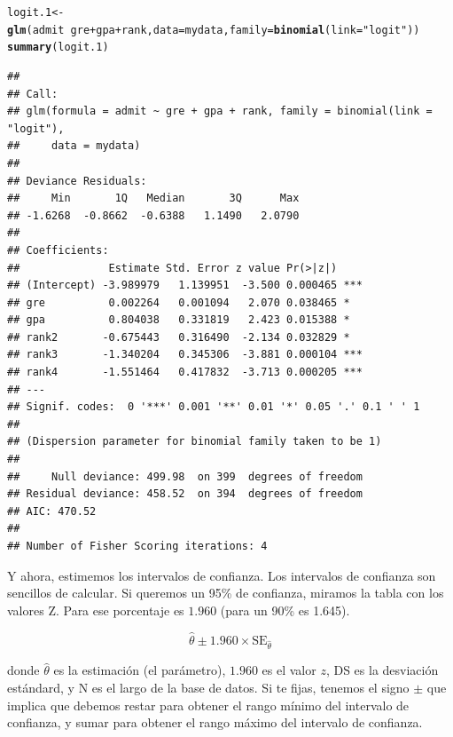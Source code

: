 \documentclass[onesided]{article}\usepackage[]{graphicx}\usepackage[]{color}
\makeatletter
\newcommand{\hlstr}[1]{\textcolor[rgb]{0.192,0.494,0.8}{#1}}%
\newcommand{\hlopt}[1]{\textcolor[rgb]{0,0,0}{#1}}%
\newcommand{\hlstd}[1]{\textcolor[rgb]{0.345,0.345,0.345}{#1}}%
\newcommand{\hlkwb}[1]{\textcolor[rgb]{0.69,0.353,0.396}{#1}}%
\newcommand{\hlkwc}[1]{\textcolor[rgb]{0.333,0.667,0.333}{#1}}%
\newcommand{\hlkwd}[1]{\textcolor[rgb]{0.737,0.353,0.396}{\textbf{#1}}}%
\newenvironment{kframe}{%
 \def\at@end@of@kframe{}%
 \ifinner\ifhmode%
  \def\at@end@of@kframe{\end{minipage}}%
  \begin{minipage}{\columnwidth}%
 \fi\fi%
 \def\FrameCommand##1{\hskip\@totalleftmargin \hskip-\fboxsep
 \colorbox{shadecolor}{##1}\hskip-\fboxsep
     \hskip-\linewidth \hskip-\@totalleftmargin \hskip\columnwidth}%
 \MakeFramed {\advance\hsize-\width
   \@totalleftmargin\z@ \linewidth\hsize
   \@setminipage}}%
 {\par\unskip\endMakeFramed%
 \at@end@of@kframe}
\newenvironment{knitrout}{}{} %
\makeatother
\begin{document}
\begin{knitrout}
\color{fgcolor}\begin{kframe}
\begin{alltt}
\hlstd{logit.1} \hlkwb{<-} \hlkwd{glm}\hlstd{(admit} \hlopt{~} \hlstd{gre} \hlopt{+} \hlstd{gpa} \hlopt{+} \hlstd{rank,} \hlkwc{data} \hlstd{= mydata,} \hlkwc{family} \hlstd{=} \hlkwd{binomial}\hlstd{(}\hlkwc{link} \hlstd{=} \hlstr{"logit"}\hlstd{))}
\hlkwd{summary}\hlstd{(logit.1)}
\end{alltt}
\begin{verbatim}
## 
## Call:
## glm(formula = admit ~ gre + gpa + rank, family = binomial(link = "logit"), 
##     data = mydata)
## 
## Deviance Residuals: 
##     Min       1Q   Median       3Q      Max  
## -1.6268  -0.8662  -0.6388   1.1490   2.0790  
## 
## Coefficients:
##              Estimate Std. Error z value Pr(>|z|)    
## (Intercept) -3.989979   1.139951  -3.500 0.000465 ***
## gre          0.002264   0.001094   2.070 0.038465 *  
## gpa          0.804038   0.331819   2.423 0.015388 *  
## rank2       -0.675443   0.316490  -2.134 0.032829 *  
## rank3       -1.340204   0.345306  -3.881 0.000104 ***
## rank4       -1.551464   0.417832  -3.713 0.000205 ***
## ---
## Signif. codes:  0 '***' 0.001 '**' 0.01 '*' 0.05 '.' 0.1 ' ' 1
## 
## (Dispersion parameter for binomial family taken to be 1)
## 
##     Null deviance: 499.98  on 399  degrees of freedom
## Residual deviance: 458.52  on 394  degrees of freedom
## AIC: 470.52
## 
## Number of Fisher Scoring iterations: 4
\end{verbatim}
\end{kframe}
\end{knitrout}

Y ahora, estimemos los intervalos de confianza. Los intervalos de confianza son sencillos de calcular. Si queremos un 95\% de confianza, miramos la tabla con los valores Z. Para ese porcentaje es $1.960$ (para un 90\% es 1.645). 

\begin{equation}
\hat\theta \pm 1.960 \times \text{SE}_{\hat\theta}
\end{equation}

donde $\hat\theta$ es la estimaci\'on (el par\'ametro), $1.960$ es el valor $z$, DS es la desviaci\'on est\'andard, y N es el largo de la base de datos. Si te fijas, tenemos el signo $\pm$ que implica que debemos restar para obtener el rango m\'inimo del intervalo de confianza, y sumar para obtener el rango m\'aximo del intervalo de confianza.
\end{document}
